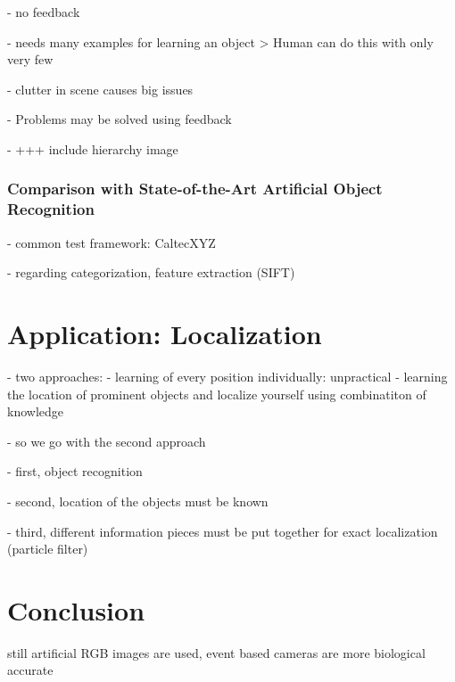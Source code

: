 			- no feedback
			
			- needs many examples for learning an object
				> Human can do this with only very few
			
			- clutter in scene causes big issues
			
			- Problems may be solved using feedback

			- +++ include hierarchy image

		\subsection{Comparison with State-of-the-Art Artificial Object Recognition}
		
			- common test framework: CaltecXYZ
		
			- regarding categorization, feature extraction (SIFT)
			
			\citep{serre2007robust}
 
\chapter{Application: Localization}

	- two approaches:
		- learning of every position individually: unpractical
		- learning the location of prominent objects and localize yourself using combinatiton of knowledge

	- so we go with the second approach

	- first, object recognition
	
	- second, location of the objects must be known
	
	- third, different information pieces must be put together for exact localization (particle filter) \citep{siagian2009biologically}


\chapter{Conclusion}

	still artificial RGB images are used, event based cameras are more biological accurate
	
